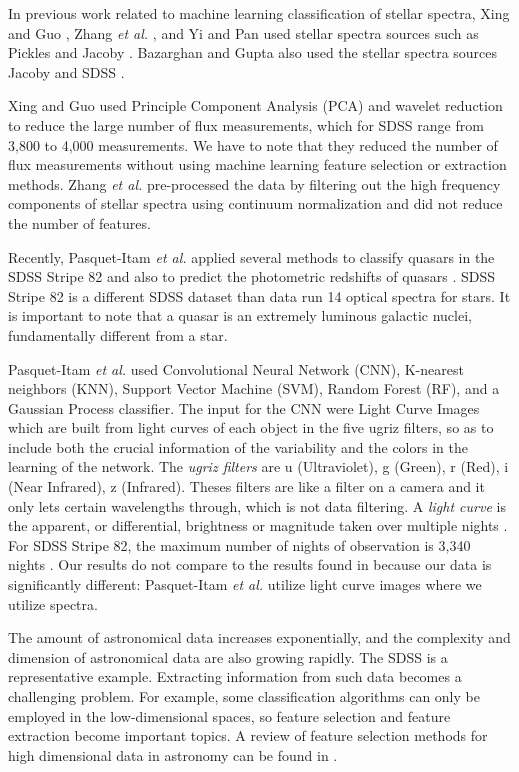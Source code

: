 \documentclass[conference]{IEEEtran}
\begin{document}
In previous work related to machine learning classification of stellar spectra, Xing and Guo \cite{Xing}, Zhang \textit{et al.} \cite{Luo}, and Yi and Pan \cite{YI} used stellar spectra sources such as Pickles \cite{Pickles} and Jacoby \cite{Jacoby}. Bazarghan and Gupta \cite{Bazarghan} also used the stellar spectra sources Jacoby and SDSS \cite{York}. 

Xing and Guo \cite{Xing} used Principle Component Analysis (PCA) and wavelet reduction to reduce the large number of flux measurements, which for SDSS range from 3,800 to 4,000 measurements. We have to note that they reduced the number of flux measurements without using  machine learning feature selection or extraction methods. Zhang \textit{et al.} \cite{Luo} pre-processed the data by filtering out the high frequency components of stellar spectra using continuum normalization and did not reduce the number of features.  

Recently, Pasquet-Itam \textit{et al.} applied several methods to classify quasars in the SDSS Stripe 82 and also to predict the photometric redshifts of quasars \cite{Pasquet2018}. SDSS Stripe 82 is a different SDSS dataset than data run 14 optical spectra for stars. It is important to note that a quasar is an extremely luminous galactic nuclei, fundamentally different from a star. 

Pasquet-Itam \textit{et al.} used Convolutional Neural Network (CNN), K-nearest neighbors (KNN), Support Vector Machine (SVM), Random Forest (RF), and a Gaussian Process classifier. The input for the CNN were Light Curve Images which are built from light curves of each object in the five ugriz filters, so as to include both the crucial information of the variability and the colors in the learning of the network. The \textit{ugriz filters} are u (Ultraviolet), g (Green), r (Red), i (Near Infrared), z (Infrared). Theses filters are like a filter on a camera and it only lets certain wavelengths through, which is not data filtering. A \textit{light curve} is the apparent, or differential, brightness or magnitude taken over multiple nights \cite{Chromey}. For SDSS Stripe 82, the maximum number of nights of observation is 3,340 nights \cite{Pasquet2018}. Our results do not compare to the results found in \cite{Pasquet2018} because our data is significantly different:  Pasquet-Itam \textit{et al.} utilize light curve images where we utilize spectra. 

The amount of astronomical data increases exponentially, and the complexity and dimension of astronomical data are also
growing rapidly. The SDSS is a representative example. Extracting information from such data becomes a challenging problem.
For example, some classification algorithms can only be employed in the low-dimensional spaces, so feature selection and
feature extraction become important topics. A review of feature selection methods for high dimensional data in astronomy can
be found in \cite{Zheng}.
\end{document}
